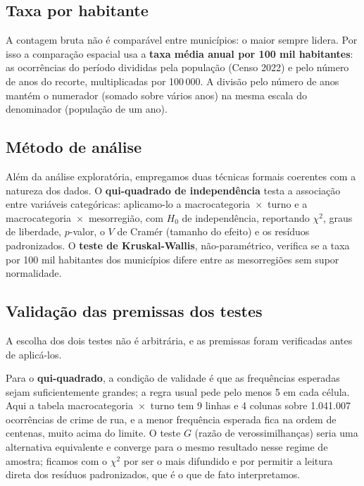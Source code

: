 \documentclass[a4paper,11pt]{article}
\begin{document}
\subsection{Taxa por habitante}
A contagem bruta não é comparável entre municípios: o maior sempre lidera. Por
isso a comparação espacial usa a \textbf{taxa média anual por 100 mil
habitantes}: as ocorrências do período divididas pela população (Censo 2022) e
pelo número de anos do recorte, multiplicadas por 100\,000. A divisão pelo número
de anos mantém o numerador (somado sobre vários anos) na mesma escala do
denominador (população de um ano).

\subsection{Método de análise}
Além da análise exploratória, empregamos duas técnicas formais coerentes com a
natureza dos dados. O \textbf{qui-quadrado de independência} testa a associação
entre variáveis categóricas: aplicamo-lo a macrocategoria~$\times$~turno e a
macrocategoria~$\times$~mesorregião, com $H_0$ de independência, reportando
$\chi^2$, graus de liberdade, $p$-valor, o $V$ de Cramér (tamanho do efeito) e os
resíduos padronizados. O \textbf{teste de Kruskal-Wallis}, não-paramétrico,
verifica se a taxa por 100 mil habitantes dos municípios difere entre as
mesorregiões sem supor normalidade.

\subsection{Validação das premissas dos testes}\label{sec:premissas}
A escolha dos dois testes não é arbitrária, e as premissas foram verificadas
antes de aplicá-los.

Para o \textbf{qui-quadrado}, a condição de validade é que as frequências
esperadas sejam suficientemente grandes; a regra usual pede pelo menos 5 em cada
célula. Aqui a tabela macrocategoria~$\times$~turno tem 9 linhas e 4 colunas
sobre 1.041.007 ocorrências de crime de rua, e a menor frequência esperada fica
na ordem de centenas, muito acima do limite. O teste $G$ (razão de
verossimilhanças) seria uma alternativa equivalente e converge para o mesmo
resultado nesse regime de amostra; ficamos com o $\chi^2$ por ser o mais
difundido e por permitir a leitura direta dos resíduos padronizados, que é o que
de fato interpretamos.
\end{document}
